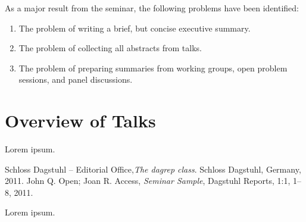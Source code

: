 \documentclass[a4paper,UKenglish]{dagrep}
\begin{document}
As a major result from the seminar, the following problems have been identified: 
\begin{enumerate}
\item The problem of writing a brief, but concise executive summary.
\item The problem of collecting all abstracts from talks.
\item The problem of preparing summaries from working groups, open problem sessions, and panel discussions.
\end{enumerate}

\tableofcontents


\section{Overview of Talks}

\license

Lorem ipsum.

\begin{thebibliography}{0}
 Schloss Dagstuhl -- Editorial Office,\textsl{The dagrep class}. Schloss Dagstuhl, Germany, 2011.
 John Q. Open; Joan R. Access, \textsl{Seminar Sample}, Dagstuhl Reports, 1:1, 1--8, 2011.
\end{thebibliography}



Lorem ipsum.

\end{document}
